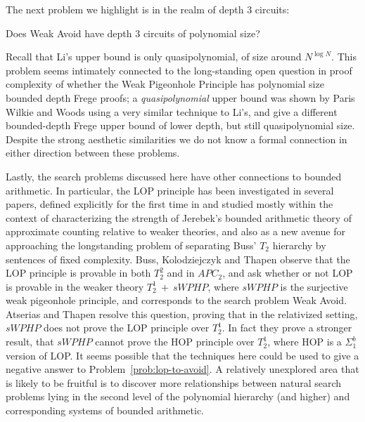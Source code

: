The next problem we highlight is in the realm of depth 3 circuits:
\begin{problem}
Does {\sc Weak Avoid} have depth 3 circuits of polynomial size?
\end{problem}
Recall that Li's upper bound is only quasipolynomial, of size around $N^{\log N}$. This problem seems intimately connected to the long-standing open question in proof complexity of whether the Weak Pigeonhole Principle has polynomial size bounded depth Frege proofs; a \emph{quasipolynomial} upper bound was shown by Paris Wilkie and Woods \cite{Paris-Wilkie-Woods} using a very similar technique to Li's, and \cite{MacielPW02} give a different bounded-depth Frege upper bound of lower depth, but still quasipolynomial size. Despite the strong aesthetic similarities we do not know a formal connection in either direction between these problems.


Lastly, the search problems discussed here have other connections to bounded arithmetic.
In particular, the {\sc LOP} principle has been investigated in several papers, defined explicitly for the first time in \cite{Chiari1998-CHIWFI} and studied mostly within the context of characterizing the  strength of Jerebek's bounded arithmetic theory of approximate counting relative to weaker theories, and also as a new avenue for approaching the longstanding problem of separating Buss' $T_2$ hierarchy by sentences of fixed complexity. 
Buss, Kolodziejczyk and Thapen \cite{BussKT14} observe that the {\sc LOP} principle is provable in both
$T^2_2$ and in $APC_2$, and ask whether or not  
{\sc LOP} is provable in the weaker theory $T^1_2 ~ + ~ sWPHP$, 
where $sWPHP$ is the surjective weak pigeonhole principle, and corresponds to the search problem {\sc Weak Avoid}.
Atserias and Thapen \cite{AtseriasT13} resolve this question,
proving that in the relativized setting,
$sWPHP$ does not prove the {\sc LOP} principle over $T^1_2$.
In fact they prove a stronger result, that 
$sWPHP$ cannot prove the HOP principle over $T^1_2$,
where HOP is a
$\Sigma_1^b$ version of {\sc LOP}. 
It seems possible that the techniques here could be used to give a negative answer to Problem~\ref{prob:lop-to-avoid}.
A relatively unexplored area that is likely to be fruitful is to discover more relationships between natural search problems lying in the second level of the polynomial hierarchy (and higher) and corresponding systems of bounded arithmetic. 



